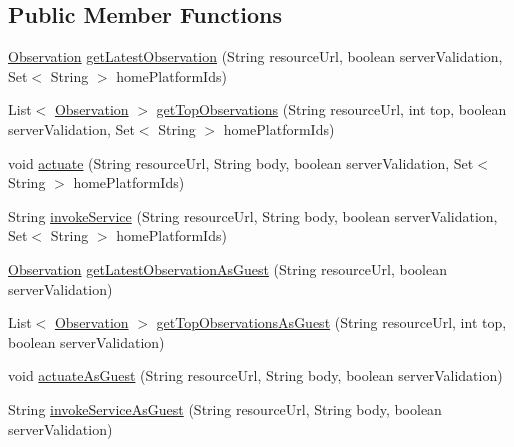 \subsection*{Public Member Functions}
\begin{DoxyCompactItemize}
\item 
\hyperlink{classeu_1_1h2020_1_1symbiote_1_1model_1_1cim_1_1Observation}{Observation} \hyperlink{interfaceeu_1_1h2020_1_1symbiote_1_1client_1_1interfaces_1_1RAPClient_a97d1282e2044da5a9eecdcff29a2f594}{get\+Latest\+Observation} (String resource\+Url, boolean server\+Validation, Set$<$ String $>$ home\+Platform\+Ids)
\item 
List$<$ \hyperlink{classeu_1_1h2020_1_1symbiote_1_1model_1_1cim_1_1Observation}{Observation} $>$ \hyperlink{interfaceeu_1_1h2020_1_1symbiote_1_1client_1_1interfaces_1_1RAPClient_ac0472c77f952810e1256a38bc634f948}{get\+Top\+Observations} (String resource\+Url, int top, boolean server\+Validation, Set$<$ String $>$ home\+Platform\+Ids)
\item 
void \hyperlink{interfaceeu_1_1h2020_1_1symbiote_1_1client_1_1interfaces_1_1RAPClient_a97a970eb1c5ad3b9367b2aede3d7f03d}{actuate} (String resource\+Url, String body, boolean server\+Validation, Set$<$ String $>$ home\+Platform\+Ids)
\item 
String \hyperlink{interfaceeu_1_1h2020_1_1symbiote_1_1client_1_1interfaces_1_1RAPClient_ad595c76248233c3775de1ad1ab57b910}{invoke\+Service} (String resource\+Url, String body, boolean server\+Validation, Set$<$ String $>$ home\+Platform\+Ids)
\item 
\hyperlink{classeu_1_1h2020_1_1symbiote_1_1model_1_1cim_1_1Observation}{Observation} \hyperlink{interfaceeu_1_1h2020_1_1symbiote_1_1client_1_1interfaces_1_1RAPClient_a6d5ca4715e7681e52afe421f269aca66}{get\+Latest\+Observation\+As\+Guest} (String resource\+Url, boolean server\+Validation)
\item 
List$<$ \hyperlink{classeu_1_1h2020_1_1symbiote_1_1model_1_1cim_1_1Observation}{Observation} $>$ \hyperlink{interfaceeu_1_1h2020_1_1symbiote_1_1client_1_1interfaces_1_1RAPClient_a8eadc8ffb3f7989d97a652fad099b544}{get\+Top\+Observations\+As\+Guest} (String resource\+Url, int top, boolean server\+Validation)
\item 
void \hyperlink{interfaceeu_1_1h2020_1_1symbiote_1_1client_1_1interfaces_1_1RAPClient_a0d89d4079a5e39852c8b2d36f04edcbc}{actuate\+As\+Guest} (String resource\+Url, String body, boolean server\+Validation)
\item 
String \hyperlink{interfaceeu_1_1h2020_1_1symbiote_1_1client_1_1interfaces_1_1RAPClient_a256f8b1fb0359bf813d5ca4bd62596a1}{invoke\+Service\+As\+Guest} (String resource\+Url, String body, boolean server\+Validation)
\end{DoxyCompactItemize}


